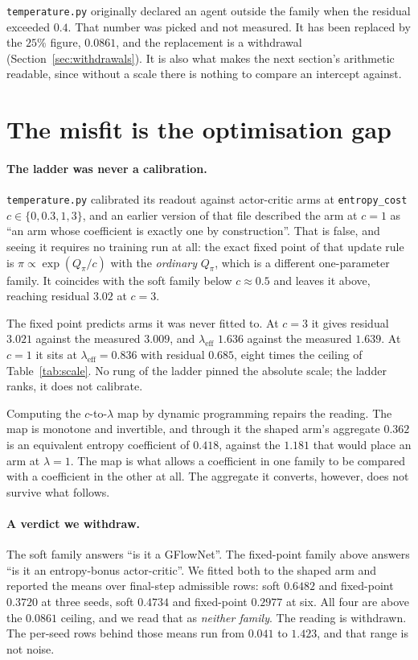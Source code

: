 \documentclass[11pt]{article}
\theoremstyle{remark}
\begin{document}
\texttt{temperature.py} originally declared an agent outside the family when the
residual exceeded $0.4$. That number was picked and not measured. It has been
replaced by the $25\%$ figure, $0.0861$, and the replacement is a withdrawal
(Section~\ref{sec:withdrawals}). It is also what makes the next section's
arithmetic readable, since without a scale there is nothing to compare an
intercept against.

\section{The misfit is the optimisation gap}\label{sec:gap}

\paragraph{The ladder was never a calibration.} \texttt{temperature.py}
calibrated its readout against actor-critic arms at \texttt{entropy\_cost} $c \in
\{0, 0.3, 1, 3\}$, and an earlier version of that file described the arm at
$c = 1$ as ``an arm whose coefficient is exactly one by construction''. That is
false, and seeing it requires no training run at all: the exact fixed point of
that update rule is $\pi \propto \exp(Q_\pi / c)$ with the \emph{ordinary}
$Q_\pi$, which is a different one-parameter family. It coincides with the soft
family below $c \approx 0.5$ and leaves it above, reaching residual $3.02$ at
$c = 3$.

The fixed point predicts arms it was never fitted to. At $c = 3$ it gives
residual $3.021$ against the measured $3.009$, and $\lambda_{\mathrm{eff}}$
$1.636$ against the measured $1.639$. At $c = 1$ it sits at
$\lambda_{\mathrm{eff}} = 0.836$ with residual $0.685$, eight times the ceiling
of Table~\ref{tab:scale}. No rung of the ladder pinned the absolute scale; the
ladder ranks, it does not calibrate.

Computing the $c$-to-$\lambda$ map by dynamic programming repairs the reading.
The map is monotone and invertible, and through it the shaped arm's aggregate
$0.362$ is an equivalent entropy coefficient of $0.418$, against the $1.181$ that
would place an arm at $\lambda = 1$. The map is what allows a coefficient in one
family to be compared with a coefficient in the other at all. The aggregate it
converts, however, does not survive what follows.

\paragraph{A verdict we withdraw.} The soft family answers ``is it a GFlowNet''.
The fixed-point family above answers ``is it an entropy-bonus actor-critic''. We
fitted both to the shaped arm and reported the means over final-step admissible
rows: soft $0.6482$ and fixed-point $0.3720$ at three seeds, soft $0.4734$ and
fixed-point $0.2977$ at six. All four are above the $0.0861$ ceiling, and we read
that as \emph{neither family}. The reading is withdrawn. The per-seed rows behind
those means run from $0.041$ to $1.423$, and that range is not noise.
\end{document}
